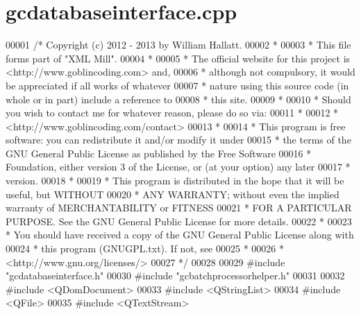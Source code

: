 \hypertarget{gcdatabaseinterface_8cpp_source}{\section{gcdatabaseinterface.\-cpp}
}

\begin{DoxyCode}
00001 \textcolor{comment}{/* Copyright (c) 2012 - 2013 by William Hallatt.}
00002 \textcolor{comment}{ *}
00003 \textcolor{comment}{ * This file forms part of "XML Mill".}
00004 \textcolor{comment}{ *}
00005 \textcolor{comment}{ * The official website for this project is <http://www.goblincoding.com> and,}
00006 \textcolor{comment}{ * although not compulsory, it would be appreciated if all works of whatever}
00007 \textcolor{comment}{ * nature using this source code (in whole or in part) include a reference to}
00008 \textcolor{comment}{ * this site.}
00009 \textcolor{comment}{ *}
00010 \textcolor{comment}{ * Should you wish to contact me for whatever reason, please do so via:}
00011 \textcolor{comment}{ *}
00012 \textcolor{comment}{ *                 <http://www.goblincoding.com/contact>}
00013 \textcolor{comment}{ *}
00014 \textcolor{comment}{ * This program is free software: you can redistribute it and/or modify it
       under}
00015 \textcolor{comment}{ * the terms of the GNU General Public License as published by the Free
       Software}
00016 \textcolor{comment}{ * Foundation, either version 3 of the License, or (at your option) any later}
00017 \textcolor{comment}{ * version.}
00018 \textcolor{comment}{ *}
00019 \textcolor{comment}{ * This program is distributed in the hope that it will be useful, but WITHOUT}
00020 \textcolor{comment}{ * ANY WARRANTY; without even the implied warranty of MERCHANTABILITY or
       FITNESS}
00021 \textcolor{comment}{ * FOR A PARTICULAR PURPOSE.  See the GNU General Public License for more
       details.}
00022 \textcolor{comment}{ *}
00023 \textcolor{comment}{ * You should have received a copy of the GNU General Public License along with}
00024 \textcolor{comment}{ * this program (GNUGPL.txt).  If not, see}
00025 \textcolor{comment}{ *}
00026 \textcolor{comment}{ *                    <http://www.gnu.org/licenses/>}
00027 \textcolor{comment}{ */}
00028 
00029 \textcolor{preprocessor}{#include "gcdatabaseinterface.h"}
00030 \textcolor{preprocessor}{#include "gcbatchprocessorhelper.h"}
00031 
00032 \textcolor{preprocessor}{#include <QDomDocument>}
00033 \textcolor{preprocessor}{#include <QStringList>}
00034 \textcolor{preprocessor}{#include <QFile>}
00035 \textcolor{preprocessor}{#include <QTextStream>}

\end{DoxyCode}
